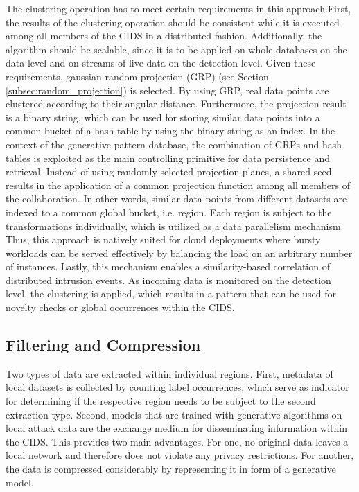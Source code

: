 \documentclass[../../main.tex]{subfiles}
\begin{document}
The clustering operation has to meet certain requirements in this approach.First, the results of the clustering operation should be consistent while it is executed among all members of the CIDS in a distributed fashion. Additionally, the algorithm should be scalable, since it is to be applied on whole databases on the data level and on streams of live data on the detection level. Given these requirements, gaussian random projection (GRP) (see Section \ref{subsec:random_projection}) is selected. By using GRP, real data points are clustered according to their angular distance. Furthermore, the projection result is a binary string, which can be used for storing similar data points into a common bucket of a hash table by using the binary string as an index. In the context of the generative pattern database, the combination of GRPs and hash tables is exploited as the main controlling primitive for data persistence and retrieval. Instead of using randomly selected projection planes, a shared seed results in the application of a common projection function among all members of the collaboration. In other words, similar data points from different datasets are indexed to a common global bucket, i.e. region. Each region is subject to the transformations individually, which is utilized as a data parallelism mechanism. Thus, this approach is natively suited for cloud deployments where bursty workloads can be served effectively by balancing the load on an arbitrary number of instances. Lastly, this mechanism enables a similarity-based correlation of distributed intrusion events. As incoming data is monitored on the detection level, the clustering is applied, which results in a pattern that can be used for novelty checks or global occurrences within the CIDS.

\subsection{Filtering and Compression}\label{subsec:filtering_and_compression}

Two types of data are extracted within individual regions. First, metadata of local datasets is collected by counting label occurrences, which serve as indicator for determining if the respective region needs to be subject to the second extraction type. Second, models that are trained with generative algorithms on local attack data are the exchange medium for disseminating information within the CIDS. This provides two main advantages. For one, no original data leaves a local network and therefore does not violate any privacy restrictions. For another, the data is compressed considerably by representing it in form of a generative model. 
\end{document}
